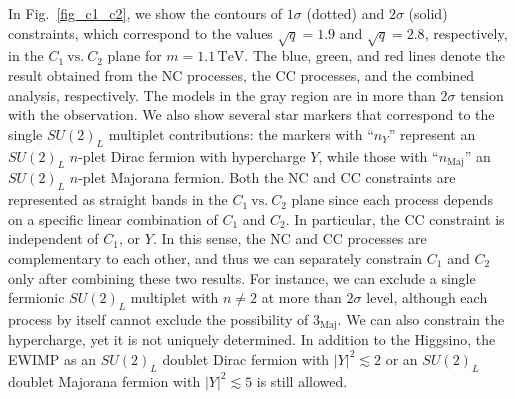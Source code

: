 \documentclass[12pt,twoside,book]{article}
\begin{document}
In Fig.~\ref{fig_c1_c2}, we show the contours of $1\sigma$ (dotted)
and $2\sigma$ (solid) constraints, which correspond to the values
$\sqrt{q}=1.9$ and $\sqrt{q}=2.8$, respectively, in the
$C_1~\mathrm{vs.}~C_2$ plane for $m=1.1\,\mathrm{TeV}$.  The blue,
green, and red lines denote the result obtained from the NC processes,
the CC processes, and the combined analysis, respectively.  The models
in the gray region are in more than $2\sigma$ tension with the
observation.  We also show several star markers that correspond to the
single $SU(2)_L$ multiplet contributions: the markers with ``$n_Y$''
represent an $SU(2)_L$ $n$-plet Dirac fermion with hypercharge $Y$,
while those with ``$n_\mathrm{Maj}$'' an $SU(2)_L$ $n$-plet Majorana
fermion.
Both the NC and CC constraints are represented
as straight bands in the $C_1~\mathrm{vs.}~C_2$ plane
since each process depends on a specific linear combination of $C_1$ and $C_2$.
In particular, the CC constraint is independent of $C_1$, or $Y$.
In this sense, the NC and CC processes are complementary to each other,
and thus we can separately constrain $C_1$ and $C_2$ only after
combining these two results.
For instance, we can exclude a single fermionic $SU(2)_L$ multiplet with $n \neq 2$ at more than
$2\sigma$ level, although
each process by itself cannot exclude the
possibility of $3_{\text{Maj}}$.
We can also constrain the hypercharge, yet it is not uniquely determined.
In addition to the Higgsino,
the EWIMP as an $SU(2)_L$ doublet Dirac fermion with
$|Y|^2\lesssim 2$ or an $SU(2)_L$ doublet Majorana fermion with
$|Y|^2\lesssim 5$ is still allowed.
\end{document}
